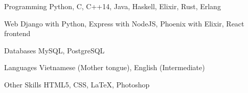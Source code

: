 


\begin{cvskills}


\cvskill
{Programming} %
{Python, C, C++14, Java, Haskell, Elixir, Rust, Erlang} %


\cvskill
{Web} %
{Django with Python, Express with NodeJS, Phoenix with Elixir, React frontend} %

\cvskill
{Databases} %
{MySQL, PostgreSQL} %


\cvskill
{Languages} %
{Vietnamese (Mother tongue), English (Intermediate)} %


\cvskill
{Other Skills} %
{HTML5, CSS, LaTeX, Photoshop}%


\end{cvskills}
